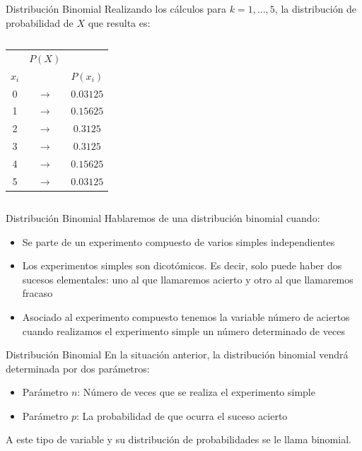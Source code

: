 \documentclass[11pt,handout]{beamer}
\begin{document}
\begin{frame}{Distribución Binomial}
Realizando los cálculos para $k = 1,...,5 $, la distribución de probabilidad de $X$ que resulta es:
\begin{columns}
\begin{column}{0.3\textwidth}
\begin{center}
\begin{tabular}{ccc}
 & $P(X)$ &  \\
$x_i$ &  &  $P(x_i)$\\ \hline 
0 & $\rightarrow$ & $0.03125$ \\ 
1 & $\rightarrow$ & $0.15625$ \\ 
2 & $\rightarrow$ & $0.3125$ \\ 
3 & $\rightarrow$ & $0.3125$ \\ 
4 & $\rightarrow$ & $0.15625$ \\ 
5 & $\rightarrow$ & $0.03125$ \\ 
\end{tabular} 
\end{center}
\end{column}
\begin{column}{0.7\textwidth}
\begin{center}

\end{center}
\end{column}

\end{columns}
\end{frame}



\begin{frame}{Distribución Binomial}
Hablaremos de una distribución binomial cuando:
\begin{itemize}[<+->]
\item Se parte de un experimento compuesto de varios simples independientes
\item Los experimentos simples son dicotómicos. Es decir, solo puede haber dos sucesos elementales: uno al que llamaremos acierto y otro al que llamaremos fracaso
\item Asociado al experimento compuesto tenemos la variable número de aciertos cuando realizamos el experimento simple un número determinado de veces
\end{itemize}
\end{frame}

\begin{frame}{Distribución Binomial}
En la situación anterior, la distribución binomial vendrá determinada por dos parámetros:
\begin{itemize}
\item Parámetro $n$: Número de veces que se realiza el experimento simple 
\item Parámetro $p$: La probabilidad de que ocurra el suceso acierto
\end{itemize}


A este tipo de variable y su distribución de probabilidades se le llama binomial.
\end{frame}
\end{document}
